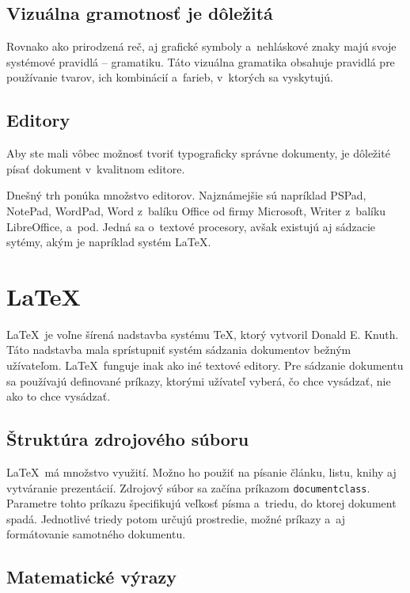 \documentclass[a4paper, 11pt, a4paper]{article}
\begin{document}
\subsection{Vizuálna gramotnosť je dôležitá}

Rovnako ako prirodzená reč, aj grafické symboly a~nehláskové znaky majú svoje systémové pravidlá -- gramatiku. Táto vizuálna gramatika obsahuje pravidlá pre používanie tvarov, ich kombinácií a~farieb, v~ktorých sa vyskytujú.~\cite{typo.Fassati.vizgram.2004}

\subsection{Editory}

Aby ste mali vôbec možnosť tvoriť typograficky správne dokumenty, je dôležité písať dokument v~kvalitnom editore.

Dnešný trh ponúka množstvo editorov. Najznámejšie sú napríklad PSPad, NotePad, WordPad, Word z~balíku Office od firmy Microsoft, Writer z~balíku LibreOffice, a~pod. Jedná sa o~textové procesory, avšak existujú aj sádzacie sytémy, akým je napríklad systém \LaTeX.~\cite{Lukes.edit.2018} 


\section{\LaTeX}

\LaTeX\ je voľne šírená nadstavba systému \TeX, ktorý vytvoril Donald E. Knuth. Táto nadstavba mala sprístupniť systém sádzania dokumentov bežným užívateľom. \LaTeX\ funguje inak ako iné textové editory. Pre sádzanie dokumentu sa používajú definované príkazy, ktorými užívateľ vyberá, čo chce vysádzať, nie ako to chce vysádzať.~\cite{Rybicka.2003}

\subsection{Štruktúra zdrojového súboru}

\LaTeX\ má množstvo využití. Možno ho použiť na písanie článku, listu, knihy aj vytváranie prezentácií. Zdrojový súbor sa začína príkazom \texttt{documentclass}. Parametre tohto príkazu špecifikujú veľkosť písma a~triedu, do ktorej dokument spadá. Jednotlivé triedy potom určujú prostredie, možné príkazy a~aj formátovanie samotného dokumentu.~\cite{Mittelbach.Goossens.2004}

\subsection{Matematické výrazy}
\end{document}
